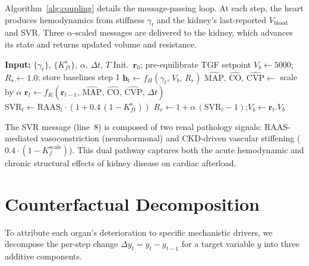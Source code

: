 \documentclass[10pt,twocolumn]{article}
\begin{document}
Algorithm~\ref{alg:coupling} details the message-passing loop. At each step, the heart produces hemodynamics from stiffness $\gamma_t$ and the kidney's last-reported $V_{\text{blood}}$ and SVR. Three $\alpha$-scaled messages are delivered to the kidney, which advances its state and returns updated volume and resistance.

\begin{algorithm}[t]
\caption{Coupled Cardiorenal Simulation}\label{alg:coupling}
\begin{algorithmic}[1]
\small
\STATE \textbf{Input:} $\{\gamma_t\}$, $\{K_f^{\text{s}}_t\}$, $\alpha$, $\Delta t$, $T$
\STATE Init.\ $\mathbf{r}_0$; pre-equilibrate TGF setpoint
\STATE $V_b \!\leftarrow\! 5000$;\; $R_r \!\leftarrow\! 1.0$;\; store baselines step 1
    \STATE $\mathbf{h}_t \leftarrow f_H(\gamma_t,\, V_b,\, R_r)$ \hfill{}
    \STATE $\widehat{\text{MAP}},\, \widehat{\text{CO}},\, \widehat{\text{CVP}} \leftarrow$ scale by $\alpha$ \hfill{}
    \STATE $\mathbf{r}_t \leftarrow f_K(\mathbf{r}_{t\!-\!1},\, \widehat{\text{MAP}},\, \widehat{\text{CO}},\, \widehat{\text{CVP}},\, \Delta t)$
    \STATE $\text{SVR}_t \leftarrow \text{RAAS}_t \cdot (1 + 0.4\,(1 \!-\! K_f^{\text{s}}_t))$
    \STATE $R_r \leftarrow 1 + \alpha\,(\text{SVR}_t - 1)$;\enspace $V_b \leftarrow \mathbf{r}_t.V_b$
\ENDFOR
\end{algorithmic}
\end{algorithm}

The SVR message (line~8) is composed of two renal pathology signals: RAAS-mediated vasoconstriction (neurohormonal) and CKD-driven vascular stiffening ($0.4 \cdot (1 - K_f^{\text{scale}})$). This dual pathway captures both the acute hemodynamic and chronic structural effects of kidney disease on cardiac afterload.

\section{Counterfactual Decomposition}
\label{sec:decomposition}

To attribute each organ's deterioration to specific mechanistic drivers, we decompose the per-step change $\Delta y_t = y_t - y_{t-1}$ for a target variable $y$ into three additive components.
\end{document}
